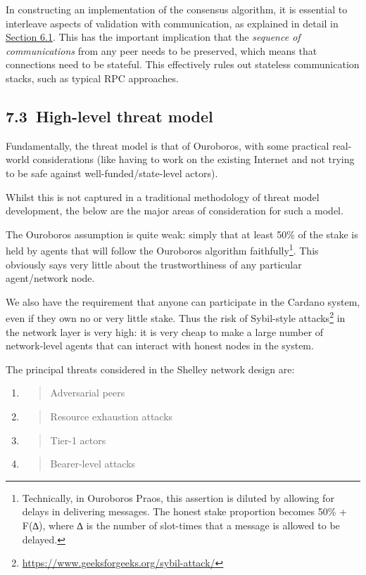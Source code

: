\documentclass[]{article}
\begin{document}
In constructing an implementation of the consensus algorithm, it is
essential to interleave aspects of validation with communication, as
explained in detail in
\protect\hyperlink{consensus-constraints-and-design-decisions}{{Section
6.1}}. This has the important implication that the \emph{sequence of
communications} from any peer needs to be preserved, which means that
connections need to be stateful. This effectively rules out stateless
communication stacks, such as typical RPC approaches.

\hypertarget{high-level-threat-model}{%
\subsection{​7.3​~High-level threat
model}\label{high-level-threat-model}}

Fundamentally, the threat model is that of Ouroboros, with some
practical real-world considerations (like having to work on the existing
Internet and not trying to be safe against well-funded/state-level
actors).

Whilst this is not captured in a traditional methodology of threat model
development, the below are the major areas of consideration for such a
model.

The Ouroboros assumption is quite weak: simply that at least 50\% of the
stake is held by agents that will follow the Ouroboros algorithm
faithfully\footnote{Technically, in Ouroboros Praos, this assertion is
  diluted by allowing for delays in delivering messages. The honest
  stake proportion becomes 50\% + F(∆), where ∆ is the number of
  slot-times that a message is allowed to be delayed.}. This obviously
says very little about the trustworthiness of any particular
agent/network node.

We also have the requirement that anyone can participate in the Cardano
system, even if they own no or very little stake. Thus the risk of
Sybil-style attacks\footnote{\href{https://www.geeksforgeeks.org/sybil-attack/}{{https://www.geeksforgeeks.org/sybil-attack/}}}
in the network layer is very high: it is very cheap to make a large
number of network-level agents that can interact with honest nodes in
the system.

The principal threats considered in the Shelley network design are:

\begin{enumerate}
\def\labelenumi{\arabic{enumi}.}
\item
  \begin{quote}
  Adversarial peers
  \end{quote}
\item
  \begin{quote}
  Resource exhaustion attacks
  \end{quote}
\item
  \begin{quote}
  Tier-1 actors
  \end{quote}
\item
  \begin{quote}
  Bearer-level attacks
  \end{quote}
\end{enumerate}
\end{document}

